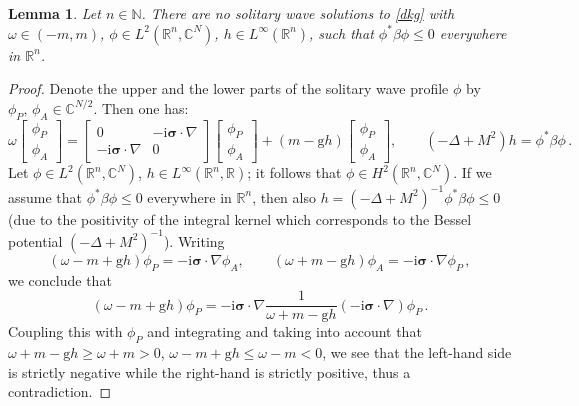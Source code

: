 \documentclass[12pt]{extarticle}
\newcommand{\coupling}{\mathrm{g}}
\newcommand{\jj}{\mathrm{i}}
\def\R{\mathbb{R}}
\newcommand{\C}{\mathbb{C}}\newcommand{\Z}{\mathbb{Z}}
\newcommand{\N}{\mathbb{N}}
\theoremstyle{plain}
\newtheorem{lemma}{Lemma}[section]
\theoremstyle{remark}
\begin{document}
\begin{lemma}
Let $n\in\N$.
There are no solitary wave solutions
to \eqref{dkg}
with $\omega\in(-m,m)$,
$\phi\in L^2(\R^n,\C^N)$,
$h\in L^\infty(\R^n)$,
such that
$\phi^*\beta\phi\le 0$
everywhere in $\R^n$.
\end{lemma}
\begin{proof}
Denote the upper and the lower
parts of the solitary wave profile
$\phi$ by $\phi_P,\,\phi_A\in\C^{N/2}$.
Then one has:
\[
    \omega
    \begin{bmatrix}\phi_P\\\phi_A\end{bmatrix}
    =
    \begin{bmatrix}0&
    -\jj\bm\sigma\cdot\nabla
    \\
    -\jj\bm\sigma\cdot\nabla
    &0\end{bmatrix}
    \begin{bmatrix}\phi_P\\\phi_A\end{bmatrix}
    +
    (m-\coupling h)
    \begin{bmatrix}\phi_P\\\phi_A\end{bmatrix},
    \qquad
    (-\Delta+M^2) h=\phi^*\beta\phi\,.
\]
Let
$\phi\in L^2(\R^n,\C^N)$,
$h\in L^\infty(\R^n,\R)$;
it follows that
$\phi\in H^2(\R^n,\C^N)$.
If we assume that
$\phi^*\beta\phi\le 0$ everywhere
in $\R^n$,
then also
$h=
(-\Delta+M^2)^{-1}
\phi^*\beta\phi\le 0$
(due to the positivity of the integral kernel
which corresponds to the
Bessel potential $(-\Delta+M^2)^{-1}$).
Writing
\[
    (\omega-m+\coupling h)\phi_P
    =-\jj\bm\sigma\cdot\nabla\phi_A,
    \qquad
    (\omega+m-\coupling h)\phi_A
    =-\jj\bm\sigma\cdot\nabla\phi_P\,,
\]
we conclude that
\[
    (\omega-m+\coupling h)\phi_P
    =-\jj\bm\sigma\cdot\nabla
    \frac{1}{\omega+m-\coupling h}
    (-\jj\bm\sigma\cdot\nabla)\phi_P\,.
\]
Coupling this with $\phi_P$ and
integrating and taking
into account that
$\omega+m-\coupling h\ge\omega+m>0$,
$\omega-m+\coupling h\le\omega-m<0$,
we see that the left-hand side
is strictly negative while the
right-hand is strictly positive, thus
a contradiction.
\end{proof}
\end{document}
